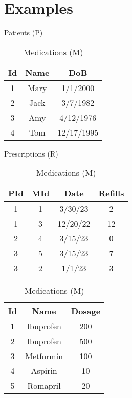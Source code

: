 \documentclass[twoside]{article}
\begin{document}
\section*{Examples}
\begin{table}[!htb]
    \begin{minipage}{.26\linewidth}
      \caption{Patients (P)}
      \centering
        \begin{tabular}{c|c|c}
            Id & Name & DoB \\
            \hline
            1 & Mary & 1/1/2000 \\
            2 & Jack & 3/7/1982 \\
            3 & Amy & 4/12/1976 \\
            4 & Tom & 12/17/1995 \\
        \end{tabular}
    \end{minipage}
    \begin{minipage}{.4\linewidth}
      \centering
        \caption{Prescriptions (R)}
        \begin{tabular}{c|c|c|c}
            PId & MId & Date & Refills \\
            \hline
            1 & 1 & 3/30/23 & 2 \\
            1 & 3 & 12/20/22 & 12 \\
            2 & 4 & 3/15/23 & 0 \\
            3 & 5 & 3/15/23 & 7\\
            3 & 2 & 1/1/23 & 3 \\
        \end{tabular}
    \end{minipage} 
    \begin{minipage}{.3\linewidth}
        \centering
          \caption{Medications (M)}
          \begin{tabular}{c|c|c}
            Id & Name & Dosage \\
            \hline
            1 & Ibuprofen & 200 \\
            2 & Ibuprofen & 500 \\
            3 & Metformin & 100 \\
            4 & Aspirin & 10 \\
            5 & Romapril & 20 \\
          \end{tabular}
      \end{minipage} 
\end{table}
\end{document}
